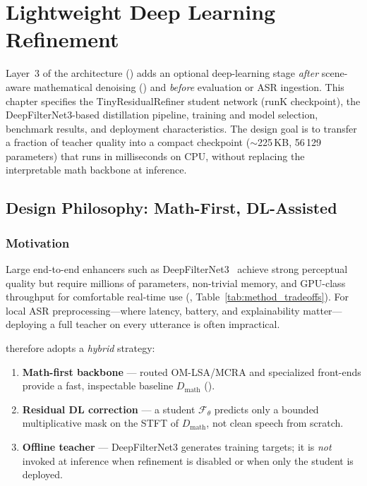 \chapter{Lightweight Deep Learning Refinement}
\label{ch:dl}

Layer~3 of the \projectshort{} architecture () adds an optional deep-learning stage \emph{after} scene-aware mathematical denoising () and \emph{before} evaluation or ASR ingestion. This chapter specifies the TinyResidualRefiner student network (runK checkpoint), the DeepFilterNet3-based distillation pipeline, training and model selection, benchmark results, and deployment characteristics. The design goal is to transfer a fraction of teacher quality into a compact checkpoint ($\sim$225\,KB, 56\,129 parameters) that runs in milliseconds on CPU, without replacing the interpretable math backbone at inference.

\section{Design Philosophy: Math-First, DL-Assisted}
\label{sec:dl_philosophy}

\subsection{Motivation}

Large end-to-end enhancers such as DeepFilterNet3~\cite{deepfilternet2023} achieve strong perceptual quality but require millions of parameters, non-trivial memory, and GPU-class throughput for comfortable real-time use (, Table~\ref{tab:method_tradeoffs}). For local ASR preprocessing---where latency, battery, and explainability matter---deploying a full teacher on every utterance is often impractical.

\projectshort{} therefore adopts a \emph{hybrid} strategy:
\begin{enumerate}
  \item \textbf{Math-first backbone} --- routed OM-LSA/MCRA and specialized front-ends provide a fast, inspectable baseline $D_{\mathrm{math}}$ ().
  \item \textbf{Residual DL correction} --- a student $\mathcal{F}_\theta$ predicts only a bounded multiplicative mask on the STFT of $D_{\mathrm{math}}$, not clean speech from scratch.
  \item \textbf{Offline teacher} --- DeepFilterNet3 generates training targets; it is \emph{not} invoked at inference when refinement is disabled or when only the student is deployed.
\end{enumerate}


